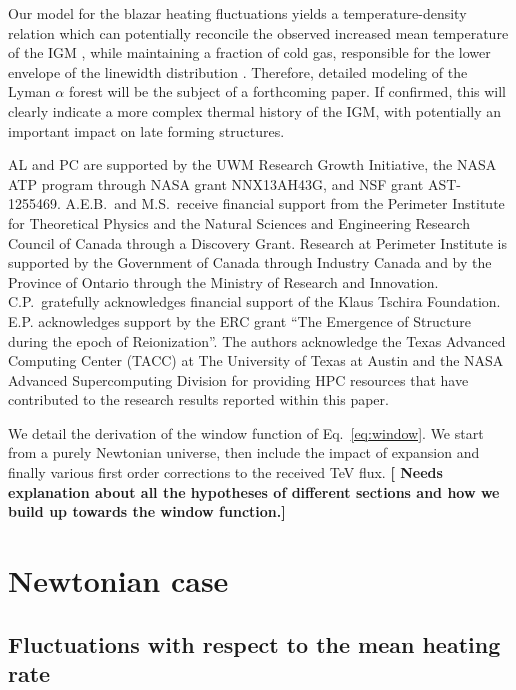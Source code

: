 \documentclass[numberedappendix]{emulateapj}
\newcommand\ALc[1]{{\color{red} \bf #1}} %
\begin{document}
{Our model for the blazar heating fluctuations yields a temperature-density relation which can potentially reconcile the observed increased mean temperature of the IGM \citep{2014MNRAS.441.1916B}, while maintaining a fraction of cold gas, responsible for the lower envelope of the linewidth distribution \citep{2012ApJ...757L..30R}. Therefore, detailed modeling of the Lyman $\alpha$ forest will be the subject of a forthcoming paper. If confirmed, this will clearly indicate a more complex thermal history of the IGM, with potentially an important impact on late forming structures.
\begin{acknowledgements}
AL and PC are supported by the UWM Research Growth Initiative, the NASA ATP
program through NASA grant NNX13AH43G, and NSF grant AST-1255469.
A.E.B.~and M.S.~receive financial support from the Perimeter
Institute for Theoretical Physics and the Natural Sciences and
Engineering Research Council of Canada through a Discovery Grant.
Research at Perimeter Institute is supported by the Government of
Canada through Industry Canada and by the Province of Ontario through
the Ministry of Research and Innovation.
C.P.~gratefully acknowledges
financial support of the Klaus Tschira Foundation. E.P. acknowledges support by the ERC grant ``The Emergence of Structure during the epoch of Reionization''.
The authors acknowledge the Texas Advanced Computing Center (TACC) at The University of Texas at Austin and the NASA Advanced Supercomputing Division for providing HPC resources that have contributed to the research results reported within this paper.
\end{acknowledgements}

\appendix
We detail the derivation of the window function of Eq.~\eqref{eq:window}. We start from a purely Newtonian universe, then include the impact of expansion and finally various first order corrections to the received TeV flux. \ALc{[{ Needs explanation about all the hypotheses of different sections and how we build up towards the window function.}]}\\

\section {Newtonian case}\label{sec:windon_newt}
\subsection {Fluctuations with respect to the mean heating rate}

}
\end{document}
